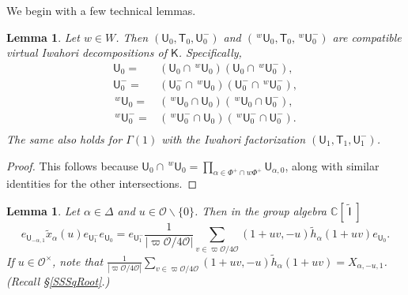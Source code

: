 \documentclass[10pt, letterpaper]{amsart}
\theoremstyle{plain}
\newtheorem{Lem}[equation]{Lemma}
\theoremstyle{definition}
\numberwithin{equation}{section}
\newcommand{\xt}{\tilde{x}}
\newcommand{\htt}{\tilde{h}}
\newcommand{\Ocal}{\mathcal{O}}
\newcommand{\Kf}{\mathsf{K}}
\newcommand{\Tf}{\mathsf{T}}
\newcommand{\Uf}{\mathsf{U}}
\newcommand{\Gammaf}{\mathsf{\Gamma}}
\newcommand{\Ift}{\widetilde{\mathsf{I}}}
\begin{document}
We begin with a few technical lemmas.


\begin{Lem}\label{WCompat}
	Let $w\in W$. Then $({\Uf}_{0},{\Tf}_{0},{\Uf}^{-}_{0})$ and $(\,^{w}{\Uf}_{0},{\Tf}_{0},\,^{w}{\Uf}^{-}_{0})$ are compatible virtual Iwahori decompositions of ${\Kf}$. Specifically, 
	\begin{align*}
		{\Uf}_0=&({\Uf}_0\cap \,^{w}{\Uf}_0)({\Uf}_0\cap \,^{w}{\Uf}_0^{-}),\\
		{\Uf}_0^{-}=&({\Uf}_0^{-}\cap \,^{w}{\Uf}_0)({\Uf}_0^{-}\cap \,^{w}{\Uf}_0^{-}),\\
		\,^{w}{\Uf}_0=&(\,^{w}{\Uf}_0\cap {\Uf}_0)(\,^{w}{\Uf}_0\cap {\Uf}_0^{-}),\\
		\,^{w}{\Uf}_0^{-}=&(\,^{w}{\Uf}_0^{-}\cap {\Uf}_0)(\,^{w}{\Uf}_0^{-}\cap {\Uf}_0^{-}).\\
	\end{align*}
	The same also holds for ${\Gammaf}(1)$ with the Iwahori factorization $({\Uf}_{1},{\Tf}_{1},{\Uf}^{-}_{1})$.
\end{Lem}

\begin{proof}
	This follows because ${\Uf}_0\cap \,^{w}{\Uf}_0=\prod_{\alpha\in \Phi^{+}\cap w\Phi^{+}}{\Uf}_{\alpha,0}$, along with similar identities for the other intersections.
\end{proof}

\begin{Lem}\label{LemVarIndRootMove1}
	Let $\alpha\in\Delta$ and $u\in\mathcal{O}\smallsetminus\{0\}$. Then in the group algebra $\mathbb{C}[\;\Ift\;]$
	\begin{equation*}
		e_{{\Uf}_{-\alpha,1}}\xt_{\alpha}(u)e_{{\Uf}_{1}^{-}}e_{{\Uf}_{0}}=e_{{\Uf}_{1}^{-}}\frac{1}{\left|\varpi\Ocal\slash 4\Ocal\right|}\sum_{v\in \varpi\mathcal{O}/4\mathcal{O}}(1+uv,-u)\htt_{\alpha}(1+uv) e_{{\Uf}_{0}}.
	\end{equation*}
If $u\in \Ocal^{\times}$, note that $\frac{1}{\left|\varpi\Ocal\slash 4\Ocal\right|}\sum_{v\in \varpi\mathcal{O}/4\mathcal{O}}(1+uv,-u)\htt_{\alpha}(1+uv)=X_{\alpha,-u,1}$. (Recall \S \ref{SSSqRoot}.)
\end{Lem}
\end{document}
